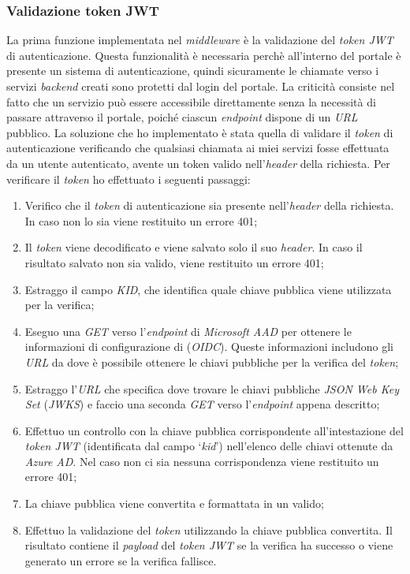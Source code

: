 \subsubsection{Validazione token JWT}\label{subsubsec:validazione-token-jwt}
La prima funzione implementata nel \textit{middleware} è la validazione del \textit{token JWT} di autenticazione. Questa funzionalità è necessaria perchè all'interno del portale è presente un sistema di autenticazione, quindi sicuramente le chiamate verso i servizi \textit{backend} creati sono protetti dal login del portale.
La criticità consiste nel fatto che un servizio può essere accessibile direttamente senza la necessità di passare attraverso il portale, poiché ciascun \textit{endpoint} dispone di un \textit{URL} pubblico.
La soluzione che ho implementato è stata quella di validare il \textit{token} di autenticazione verificando che qualsiasi chiamata ai miei servizi fosse effettuata da un utente autenticato, avente un token valido nell'\textit{header} della richiesta.
Per verificare il \textit{token} ho effettuato i seguenti passaggi:
\begin{enumerate}
  \item Verifico che il \textit{token} di autenticazione sia presente nell'\textit{header} della richiesta. In caso non lo sia viene restituito un errore 401;
  \item Il \textit{token} viene decodificato e viene salvato solo il suo \textit{header}. In caso il risultato salvato non sia valido, viene restituito un errore 401;
  \item Estraggo il campo \textit{KID}, che identifica quale chiave pubblica viene utilizzata per la verifica;
  \item Eseguo una \textit{GET} verso l'\textit{endpoint} di \textit{Microsoft AAD} per ottenere le informazioni di configurazione di  (\textit{OIDC}). 
  Queste informazioni includono gli \textit{URL} da dove è possibile ottenere le chiavi pubbliche per la verifica del \textit{token};
  \item Estraggo l'\textit{URL} che specifica dove trovare le chiavi pubbliche \textit{JSON Web Key Set} (\textit{JWKS}) e faccio una seconda \textit{GET} verso l'\textit{endpoint} appena descritto;
  \item Effettuo un controllo con la chiave pubblica corrispondente all'intestazione del \textit{token JWT} (identificata dal campo `\textit{kid}') nell'elenco delle chiavi ottenute da \textit{Azure AD}. Nel caso non ci sia nessuna corrispondenza viene restituito un errore 401;
  \item La chiave pubblica viene convertita e formattata in un  valido;
  \item Effettuo la validazione del \textit{token} utilizzando la chiave pubblica convertita. Il risultato contiene il \textit{payload} del \textit{token JWT} se la verifica ha successo o viene generato un errore se la verifica fallisce.
\end{enumerate}

